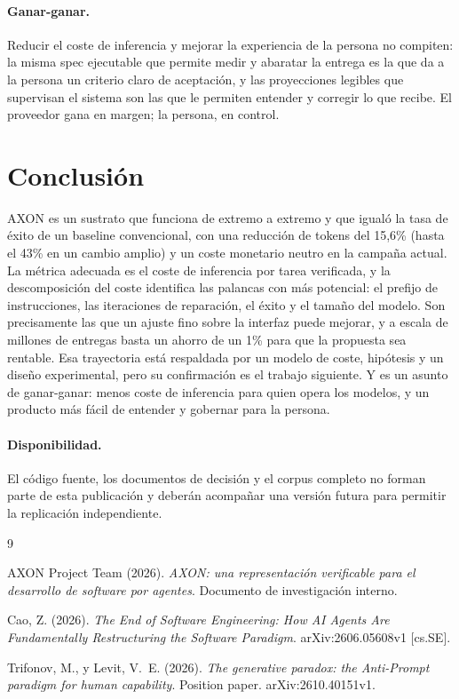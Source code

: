 \documentclass[11pt, a4paper]{article}
\newcommand{\pc}{\mbox{\%}}
\begin{document}
\paragraph{Ganar-ganar.} Reducir el coste de inferencia y mejorar la experiencia de la persona no compiten: la misma spec ejecutable que permite medir y abaratar la entrega es la que da a la persona un criterio claro de aceptación, y las proyecciones legibles que supervisan el sistema son las que le permiten entender y corregir lo que recibe. El proveedor gana en margen; la persona, en control.

\section{Conclusión}

AXON es un sustrato que funciona de extremo a extremo y que igualó la tasa de éxito de un baseline convencional, con una reducción de tokens del 15,6\pc{} (hasta el 43\pc{} en un cambio amplio) y un coste monetario neutro en la campaña actual. La métrica adecuada es el coste de inferencia por tarea verificada, y la descomposición del coste identifica las palancas con más potencial: el prefijo de instrucciones, las iteraciones de reparación, el éxito y el tamaño del modelo. Son precisamente las que un ajuste fino sobre la interfaz puede mejorar, y a escala de millones de entregas basta un ahorro de un 1\pc{} para que la propuesta sea rentable. Esa trayectoria está respaldada por un modelo de coste, hipótesis y un diseño experimental, pero su confirmación es el trabajo siguiente. Y es un asunto de ganar-ganar: menos coste de inferencia para quien opera los modelos, y un producto más fácil de entender y gobernar para la persona.

\paragraph{Disponibilidad.} El código fuente, los documentos de decisión y el corpus completo no forman parte de esta publicación y deberán acompañar una versión futura para permitir la replicación independiente.

\begin{thebibliography}{9}

AXON Project Team (2026).
\textit{AXON: una representación verificable para el desarrollo de software por agentes}. Documento de investigación interno.

Cao, Z. (2026).
\textit{The End of Software Engineering: How AI Agents Are Fundamentally Restructuring the Software Paradigm}. arXiv:2606.05608v1 [cs.SE].

Trifonov, M., y Levit, V.~E. (2026).
\textit{The generative paradox: the Anti-Prompt paradigm for human capability}. Position paper. arXiv:2610.40151v1.

\end{thebibliography}
\end{document}
